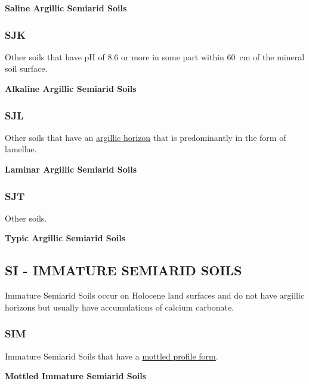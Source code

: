 \documentclass[
  letterpaper,
  DIV=11,
  numbers=noendperiod]{scrreprt}
\begin{document}
\textbf{Saline Argillic Semiarid Soils}

\hypertarget{sec-key-SJK}{%
\subsubsection{\texorpdfstring{\textbf{SJK}}{SJK}}\label{sec-key-SJK}}

Other soils that have pH of 8.6 or more in some part within 60~cm of the
mineral soil surface.

\textbf{Alkaline Argillic Semiarid Soils}

\hypertarget{sec-key-SJL}{%
\subsubsection{\texorpdfstring{\textbf{SJL}}{SJL}}\label{sec-key-SJL}}

Other soils that have an \protect\hyperlink{sec-diag-argh}{argillic
horizon} that is predominantly in the form of lamellae.

\textbf{Laminar Argillic Semiarid Soils}

\hypertarget{sec-key-SJT}{%
\subsubsection{\texorpdfstring{\textbf{SJT}}{SJT}}\label{sec-key-SJT}}

Other soils.

\textbf{Typic Argillic Semiarid Soils}

\hypertarget{sec-SI}{%
\subsection{\texorpdfstring{\textbf{SI} - IMMATURE SEMIARID
SOILS}{SI - IMMATURE SEMIARID SOILS}}\label{sec-SI}}

Immature Semiarid Soils occur on Holocene land surfaces and do not have
argillic horizons but usually have accumulations of calcium carbonate.

\hypertarget{sec-key-SIM}{%
\subsubsection{\texorpdfstring{\textbf{SIM}}{SIM}}\label{sec-key-SIM}}

Immature Semiarid Soils that have a
\protect\hyperlink{sec-diag-mottpf}{mottled profile form}.

\textbf{Mottled Immature Semiarid Soils}
\end{document}
